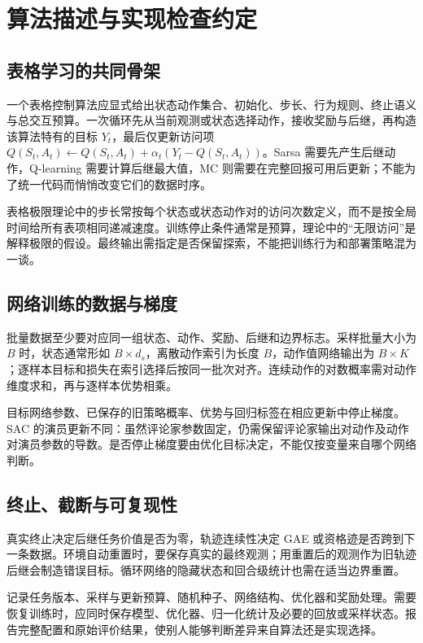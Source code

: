 \documentclass[UTF8,12pt,a4paper,fontset=fandol]{ctexbook}
\begin{document}
\chapter{算法描述与实现检查约定}
\label{app:rl-algorithms}

\section{表格学习的共同骨架}

一个表格控制算法应显式给出状态动作集合、初始化、步长、行为规则、终止语义与总交互预算。一次循环先从当前观测或状态选择动作，接收奖励与后继，再构造该算法特有的目标 $Y_t$，最后仅更新访问项 $Q(S_t,A_t)\leftarrow Q(S_t,A_t)+\alpha_t(Y_t-Q(S_t,A_t))$。Sarsa 需要先产生后继动作，Q-learning 需要计算后继最大值，MC 则需要在完整回报可用后更新；不能为了统一代码而悄悄改变它们的数据时序。

表格极限理论中的步长常按每个状态或状态动作对的访问次数定义，而不是按全局时间给所有表项相同递减速度。训练停止条件通常是预算，理论中的“无限访问”是解释极限的假设。最终输出需指定是否保留探索，不能把训练行为和部署策略混为一谈。

\section{网络训练的数据与梯度}

批量数据至少要对应同一组状态、动作、奖励、后继和边界标志。采样批量大小为 $B$ 时，状态通常形如 $B\times d_s$，离散动作索引为长度 $B$，动作值网络输出为 $B\times K$；逐样本目标和损失在索引选择后按同一批次对齐。连续动作的对数概率需对动作维度求和，再与逐样本优势相乘。

目标网络参数、已保存的旧策略概率、优势与回归标签在相应更新中停止梯度。SAC 的演员更新不同：虽然评论家参数固定，仍需保留评论家输出对动作及动作对演员参数的导数。是否停止梯度要由优化目标决定，不能仅按变量来自哪个网络判断。

\section{终止、截断与可复现性}

真实终止决定后继任务价值是否为零，轨迹连续性决定 GAE 或资格迹是否跨到下一条数据。环境自动重置时，要保存真实的最终观测；用重置后的观测作为旧轨迹后继会制造错误目标。循环网络的隐藏状态和回合级统计也需在适当边界重置。

记录任务版本、采样与更新预算、随机种子、网络结构、优化器和奖励处理。需要恢复训练时，应同时保存模型、优化器、归一化统计及必要的回放或采样状态。报告完整配置和原始评价结果，使别人能够判断差异来自算法还是实现选择。
\end{document}
